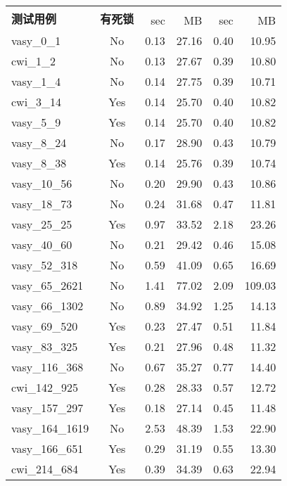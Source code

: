\begin{figure}[h!]
	\centering
	\scriptsize
	\setlength{\tabcolsep}{8pt}
	\begin{tabular}{| l | c | r | r | r | r |}
		\hline
		\multirow{2}{1.3cm}{\textbf{测试用例}} & \multirow{2}{1cm}{\textbf{有死锁}} & \multicolumn{2}{c|}{\sctlprov{}} & \multicolumn{2}{c|}{\CADP{}}\\
		\cline{3-6}
		{}&{} & sec & MB & sec & MB\\
		\hline
		vasy\_0\_1 & No & 0.13 &	27.16 &	0.40 &	10.95\\\hline
		cwi\_1\_2 & No & 0.13 &	27.67 &	0.39 &	10.80\\\hline
		vasy\_1\_4 	& No & 0.14 &	27.75 &	0.39 &	10.71\\\hline
		cwi\_3\_14 	& Yes & 0.14 &	25.70 &	0.40 &	10.82\\\hline
		vasy\_5\_9 	& Yes &	0.14 &	25.70 &	0.40 &	10.82\\\hline
		vasy\_8\_24 & No &	0.17 & 	28.90 &	0.43 &	10.79\\\hline
		vasy\_8\_38 & Yes &	0.14 &	25.76 &	0.39 &	10.74\\\hline
		vasy\_10\_56 &	No & 0.20 &	29.90 &	0.43 &	10.86\\\hline
		vasy\_18\_73 &	No & 0.24 &	31.68 &	0.47 &	11.81\\\hline
		vasy\_25\_25 &	Yes & 0.97 & 33.52 & 2.18 &	23.26\\\hline
		vasy\_40\_60 &	No &	0.21 &	29.42 &	0.46 &	15.08\\\hline
		vasy\_52\_318 &	No &	0.59 &	41.09 &	0.65 &	16.69\\\hline
		vasy\_65\_2621 & No &	1.41 &	77.02 &	2.09 &	109.03\\\hline
		vasy\_66\_1302 & No &	0.89 &	34.92 &	1.25 &  14.13\\\hline
		vasy\_69\_520 &	Yes &	0.23 &	27.47 &	0.51 &	11.84\\\hline
		vasy\_83\_325 &	Yes &	0.21 &	27.96 &	0.48 &	11.32\\\hline
		vasy\_116\_368 & No &	0.67 &	35.27 &	0.77 &	14.40\\\hline
		cwi\_142\_925 & Yes &	0.28 &	28.33 &	0.57 &	12.72\\\hline
		vasy\_157\_297 & Yes &	0.18 &	27.14 &	0.45 &	11.48\\\hline
		vasy\_164\_1619 & No &	2.53 &	48.39 &	1.53 &	22.90\\\hline
		vasy\_166\_651 & Yes &	0.29 &	31.19 &	0.55 &	13.30\\\hline
		cwi\_214\_684 &	Yes &	0.39 &	34.39 &	0.63 &	22.94\\\hline

\end{tabular}
\end{figure}

